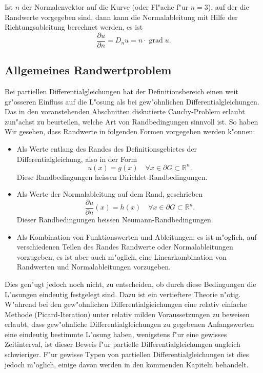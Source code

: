 Ist $n$ der Normalenvektor auf die Kurve (oder Fl"ache f"ur $n=3$), auf
der die Randwerte vorgegeben sind, dann kann die Normalableitung mit 
Hilfe der Richtungsableitung berechnet werden, es ist
\[
\frac{\partial u}{\partial n}=D_nu = n\cdot \operatorname{grad} u.
\]

\subsection{Allgemeines Randwertproblem\label{klassifikation:allgemeines-randwertproblem}}
Bei partiellen Differentialgleichungen hat der Definitionsbereich einen
weit gr"osseren Einfluss auf die L"osung als bei gew"ohnlichen
Differentialgleichungen. Das in den voranstehenden Abschnitten
diskutierte Cauchy-Problem erlaubt zun"achst zu beurteilen, welche
Art von Randbedingungen sinnvoll ist. 
So haben Wir gesehen, dass Randwerte in folgenden Formen vorgegeben
werden k"onnen: 
\begin{itemize}
\item Als Werte entlang des Randes des Definitionsgebietes der
Differentialgleichung, also in der Form
\[
u(x)=g(x)\quad \forall x\in\partial G\subset \mathbb R^n.
\]
Diese Randbedingungen heissen Dirichlet-Randbedingungen.
\item Als Werte der Normalableitung auf dem
Rand, geschrieben
\[
\frac{\partial u}{\partial n}(x)=h(x)\quad\forall x\in\partial G\subset \mathbb R^n.
\]
Dieser Randbedingungen heissen Neumann-Randbedingungen.
\item Als Kombination von Funktionswerten und Ableitungen: es ist
m"oglich, auf verschiedenen Teilen des Randes Randwerte oder Normalableitungen
vorzugeben, es ist aber auch m"oglich, eine Linearkombination
von Randwerten und Normalableitungen vorzugeben.
\end{itemize}
Dies gen"ugt jedoch noch nicht, zu entscheiden, ob durch diese
Bedingungen die L"osungen eindeutig festgelegt sind.
Dazu ist ein vertieftere Theorie n"otig. W"ahrend bei den gew"ohnlichen
Differentialgieichungen eine relativ einfache Methode (Picard-Iteration)
unter relativ milden Voraussetzungen zu beweisen  erlaubt, dass
gew"ohnliche Differentialgleichungen zu gegebenen Anfangswerten eine
eindeutig bestimmte L"osung haben, wenigstens f"ur eine gewisses Zeitinterval,
ist dieser Beweis f"ur partielle Differentialgleichungen ungleich schwieriger.
F"ur gewisse Typen von partiellen Differentialgleichungen ist dies jedoch
m"oglich, einige davon werden in den kommenden Kapiteln behandelt.

